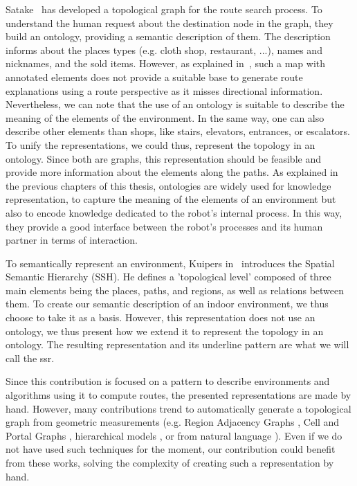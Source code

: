 Satake~\cite{satake_2015_field} has developed a topological graph for the route search process. To understand the human request about the destination node in the graph, they build an ontology, providing a semantic description of them. The description informs about the places types (e.g. cloth shop, restaurant, ...), names and nicknames, and the sold items. However, as explained in~\cite{morales_2015_building}, such a map with annotated elements does not provide a suitable base to generate route explanations using a route perspective as it misses directional information. Nevertheless, we can note that the use of an ontology is suitable to describe the meaning of the elements of the environment. In the same way, one can also describe other elements than shops, like stairs, elevators, entrances, or escalators. To unify the representations, we could thus, represent the topology in an ontology. Since both are graphs, this representation should be feasible and provide more information about the elements along the paths. As explained in the previous chapters of this thesis, ontologies are widely used for knowledge representation, to capture the meaning of the elements of an environment but also to encode knowledge dedicated to the robot's internal process. In this way, they provide a good interface between the robot's processes and its human partner in terms of interaction.%

To semantically represent an environment, Kuipers in~\cite{kuipers_2000_spatial} introduces the Spatial Semantic Hierarchy (SSH). He defines a 'topological level' composed of three main elements being the places, paths, and regions, as well as relations between them. To create our semantic description of an indoor environment, we thus choose to take it as a basis. However, this representation does not use an ontology, we thus present how we extend it to represent the topology in an ontology. The resulting representation and its underline pattern are what we will call the \acrfull{ssr}.

Since this contribution is focused on a pattern to describe environments and algorithms using it to compute routes, the presented representations are made by hand. However, many contributions trend to automatically generate a topological graph from geometric measurements (e.g. Region Adjacency Graphs \cite{kuipers_2004_local}, Cell and Portal Graphs \cite{lefebvre_2003_automatic}, hierarchical models \cite{lorenz_2006_hybrid}, or from natural language \cite{hemachandra_2014_learning}). Even if we do not have used such techniques for the moment, our contribution could benefit from these works, solving the complexity of creating such a representation by hand.

